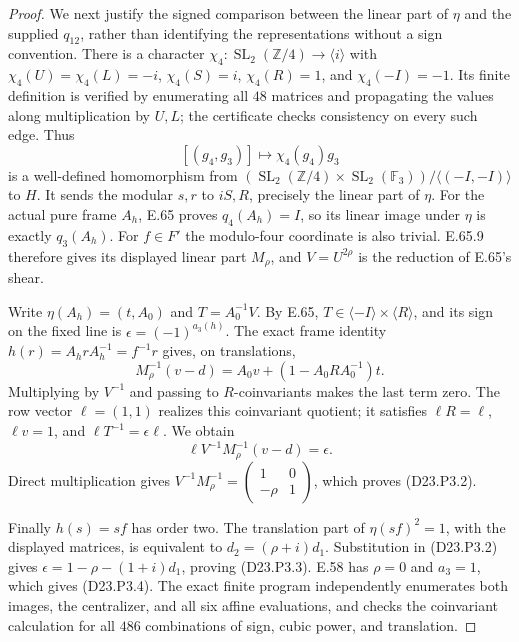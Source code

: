 \begin{proof}
We next justify the signed comparison between the linear part of
$\eta$ and the supplied $q_{12}$, rather than identifying the
representations without a sign convention. There is a character
$\chi_4:\operatorname{SL}_2(\mathbb Z/4)\to\langle i\rangle$
with $\chi_4(U)=\chi_4(L)=-i$, $\chi_4(S)=i$,
$\chi_4(R)=1$, and $\chi_4(-I)=-1$. Its finite definition is
verified by enumerating all $48$ matrices and propagating the
values along multiplication by $U,L$; the certificate checks
consistency on every such edge. Thus
\[
 [(g_4,g_3)]\longmapsto\chi_4(g_4)g_3
\]
is a well-defined homomorphism from
$(\operatorname{SL}_2(\mathbb Z/4)\times
\operatorname{SL}_2(\mathbb F_3))/\langle(-I,-I)\rangle$ to $H$.
It sends the modular $s,r$ to $iS,R$, precisely the linear part
of $\eta$. For the actual pure frame $A_h$, E.65 proves
$q_4(A_h)=I$, so its linear image under $\eta$ is exactly
$q_3(A_h)$. For $f\in F'$ the modulo-four coordinate is also
trivial. E.65.9 therefore gives its displayed linear part
$M_\rho$, and $V=U^{2\rho}$ is the reduction of E.65's shear.

Write $\eta(A_h)=(t,A_0)$ and $T=A_0^{-1}V$. By E.65,
$T\in\langle-I\rangle\times\langle R\rangle$, and its sign
on the fixed line is $\epsilon=(-1)^{a_3(h)}$. The exact frame
identity $h(r)=A_hrA_h^{-1}=f^{-1}r$ gives, on translations,
\[
 M_\rho^{-1}(v-d)
       =A_0v+(1-A_0RA_0^{-1})t.
\]
Multiplying by $V^{-1}$ and passing to $R$-coinvariants makes
the last term zero. The row vector $\ell=(1,1)$ realizes this
coinvariant quotient; it satisfies $\ell R=\ell$, $\ell v=1$,
and $\ell T^{-1}=\epsilon\ell$. We obtain
\[
 \ell V^{-1}M_\rho^{-1}(v-d)=\epsilon.
\]
Direct multiplication gives
$V^{-1}M_\rho^{-1}=\left(\begin{smallmatrix}1&0\\-\rho&1\end{smallmatrix}\right)$,
which proves (D23.P3.2).

Finally $h(s)=sf$ has order two. The translation part of
$\eta(sf)^2=1$, with the displayed matrices, is equivalent to
$d_2=(\rho+i)d_1$. Substitution in (D23.P3.2) gives
$\epsilon=1-\rho-(1+i)d_1$, proving (D23.P3.3).
E.58 has $\rho=0$ and $a_3=1$, which gives (D23.P3.4).
The exact finite program 
independently enumerates both images, the centralizer, and all
six affine evaluations, and checks the coinvariant calculation
for all $486$ combinations of sign, cubic power, and translation.
\end{proof}

